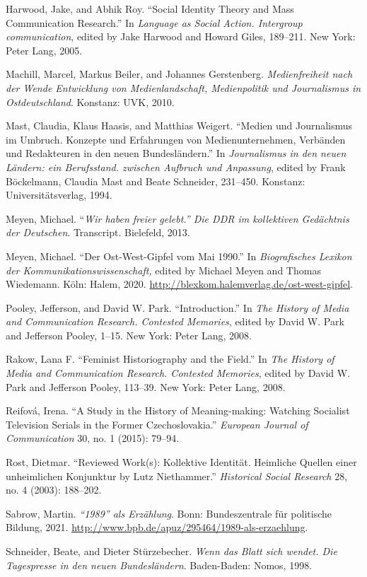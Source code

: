 \documentclass{tufte-handout}
\begin{document}
\begin{hangparas}{.25in}{1}
Harwood, Jake, and Abhik Roy. ``Social Identity Theory and Mass
Communication Research.'' In \emph{Language as Social Action. Intergroup
communication}, edited by Jake Harwood and Howard Giles, 189--211. New
York: Peter Lang, 2005.

Machill, Marcel, Markus Beiler, and Johannes Gerstenberg.
\emph{Medienfreiheit nach der Wende Entwicklung von Medienlandschaft,
Medienpolitik und Journalismus in Ostdeutschland}. Konstanz: UVK, 2010.

Mast, Claudia, Klaus Haasis, and Matthias Weigert. ``Medien und
Journalismus im Umbruch. Konzepte und Erfahrungen von Medienunternehmen,
Verbänden und Redakteuren in den neuen Bundesländern.'' In
\emph{Journalismus in den neuen Ländern: ein Berufsstand. zwischen
Aufbruch und Anpassung}, edited by Frank Böckelmann, Claudia Mast and
Beate Schneider, 231--450. Konstanz: Universitätsverlag, 1994.

Meyen, Michael. ``\emph{Wir haben freier gelebt.'' Die DDR im
kollektiven Gedächtnis der Deutschen}. Transcript. Bielefeld, 2013.

Meyen, Michael. ``Der Ost-West-Gipfel vom Mai 1990.'' In
\emph{Biografisches Lexikon der Kommunikationswissenschaft,} edited by
Michael Meyen and Thomas Wiedemann. Köln: Halem, 2020.
\url{http://blexkom.halemverlag.de/ost-west-gipfel}.

Pooley, Jefferson, and David W. Park. ``Introduction.'' In \emph{The
History of Media and Communication Research. Contested Memories}, edited
by David W. Park and Jefferson Pooley, 1--15. New York: Peter Lang,
2008.

Rakow, Lana F. ``Feminist Historiography and the Field.'' In \emph{The
History of Media and Communication Research. Contested Memories}, edited
by David W. Park and Jefferson Pooley, 113--39. New York: Peter Lang,
2008.

Reifová, Irena. ``A Study in the History of Meaning-making: Watching
Socialist Television Serials in the Former Czechoslovakia.''
\emph{European Journal of Communication} 30, no. 1 (2015): 79--94.

Rost, Dietmar. ``Reviewed Work(s): Kollektive Identität. Heimliche
Quellen einer unheimlichen Konjunktur by Lutz Niethammer.''
\emph{Historical Social Research} 28, no. 4 (2003): 188--202.

Sabrow, Martin. \emph{``1989'' als Erzählung}. Bonn: Bundeszentrale für
politische Bildung, 2021.
\url{http://www.bpb.de/apuz/295464/1989-als-erzaehlung}.

Schneider, Beate, and Dieter Stürzebecher. \emph{Wenn das Blatt sich
wendet. Die Tagespresse in den neuen Bundesländern}. Baden-Baden: Nomos,
1998.


\end{hangparas}
\end{document}
